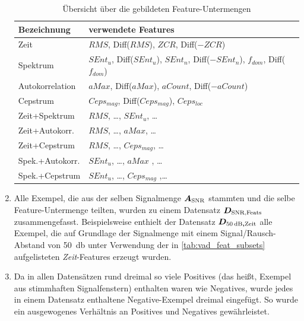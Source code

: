 \begin{enumerate}
\begin{table}[h]
\centering
\caption{Übersicht über die gebildeten Feature-Untermengen}
\label{tab:vad_feat_subsets}
\begin{tabular}{@{}ll@{}}
\toprule
Bezeichnung & verwendete Features                                                              \\ \midrule
Zeit                     & $RMS$, Diff($RMS$), $ZCR$, Diff($-ZCR$)                                                  \\
Spektrum                 & $SEnt_u$, Diff($SEnt_u$), $SEnt_n$, Diff($-SEnt_n$), $f_{dom}$, Diff($f_{dom}$) \\
Autokorrelation          & $aMax$, Diff($aMax$), $aCount$, Diff($-aCount$)                                          \\
Cepstrum                 & $Ceps_{mag}$, Diff($Ceps_{mag}$), $Ceps_{loc}$                                   \\
Zeit+Spektrum            & $RMS$, \ldots , $SEnt_u$, \ldots                                                   \\
Zeit+Autokorr.           & $RMS$, \ldots , $aMax$, \ldots                                                       \\
Zeit+Cepstrum            & $RMS$, \ldots , $Ceps_{mag}$, \ldots                                               \\
Spek.+Autokorr.          & $SEnt_u$, \ldots , $aMax$ , \ldots                                                 \\
Spek.+Cepstrum           & $SEnt_u$, \ldots, $Ceps_{mag}$ ,\ldots                                           \\ \bottomrule
\end{tabular}
\end{table}

\item Alle Exempel, die aus der selben Signalmenge $\boldmath{A_{\text{SNR}}}$ stammten und die selbe Feature-Untermenge teilten, wurden zu einem Datensatz $\boldmath{D_{\text{SNR,Feats}}}$ zusammengefasst. Beispielsweise enthielt der Datensatz $\boldmath{D_{\SI{50}{\decibel},\text{Zeit}}}$ alle Exempel, die auf Grundlage der Signalmenge mit einem Signal/Rausch-Abstand von \SI{50}{\decibel} unter Verwendung der in \autoref{tab:vad_feat_subsets} aufgelisteten \emph{Zeit}-Features erzeugt wurden.
\item Da in allen Datensätzen rund dreimal so viele Positives (das heißt, Exempel aus stimmhaften Signalfenstern) enthalten waren wie Negatives, wurde jedes in einem Datensatz enthaltene Negative-Exempel dreimal eingefügt. So wurde ein ausgewogenes Verhältnis an Positives und Negatives gewährleistet.
\end{enumerate}

